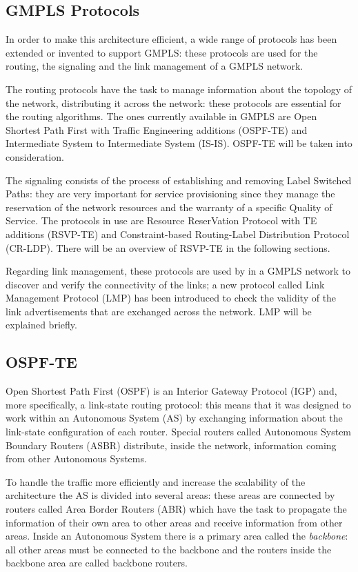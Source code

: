 \documentclass[10pt,a4paper]{report}
\begin{document}
\subsection{GMPLS Protocols}

In order to make this architecture efficient, a wide range of
protocols has been extended or invented to support GMPLS: these
protocols are used for the routing, the signaling and the link
management of a GMPLS network.

The routing protocols have the task to manage information about the
topology of the network, distributing it across the network: these
protocols are essential for the routing algorithms. The ones currently
available in GMPLS are Open Shortest Path First with Traffic
Engineering additions (OSPF-TE) and Intermediate System to
Intermediate System (IS-IS). OSPF-TE will be taken into consideration.

The signaling consists of the process of establishing and removing
Label Switched Paths: they are very important for service provisioning
since they manage the reservation of the network resources and the
warranty of a specific Quality of Service. The protocols in use are
Resource ReserVation Protocol with TE additions (RSVP-TE) and
Constraint-based Routing-Label Distribution Protocol (CR-LDP). There
will be an overview of RSVP-TE in the following sections.

\newpage

Regarding link management, these protocols are used by in a GMPLS
network to discover and verify the connectivity of the links; a new
protocol called Link Management Protocol (LMP) has been introduced to
check the validity of the link advertisements that are exchanged
across the network. LMP will be explained briefly.

\subsection{OSPF-TE}

Open Shortest Path First (OSPF) is an Interior Gateway Protocol (IGP)
and, more specifically, a link-state routing protocol: this means that
it was designed to work within an Autonomous System (AS) by exchanging
information about the link-state configuration of each router. Special
routers called Autonomous System Boundary Routers (ASBR) distribute,
inside the network, information coming from other Autonomous Systems.

To handle the traffic more efficiently and increase the scalability of
the architecture the AS is divided into several areas: these areas are
connected by routers called Area Border Routers (ABR) which have the
task to propagate the information of their own area to other areas and
receive information from other areas. Inside an Autonomous System
there is a primary area called the \textit{backbone}: all other areas
must be connected to the backbone and the routers inside the backbone
area are called backbone routers.
\end{document}
